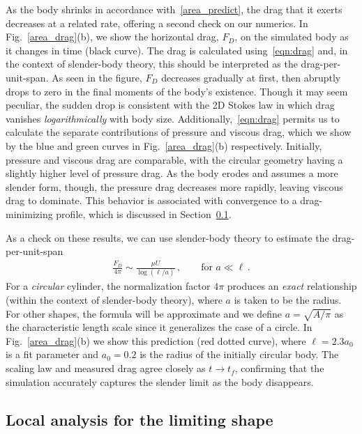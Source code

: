 \documentclass[preprint, 10pt]{elsarticle}
\begin{document}
As the body shrinks in accordance with~\eqref{area_predict}, the drag that it exerts decreases at a related rate, offering a second check on our numerics. In Fig.~\ref{area_drag}(b), we show the horizontal drag, $F_D$, on the simulated body as it changes in time (black curve). The drag is calculated using~\eqref{eqn:drag} and, in the context of slender-body theory, this should be interpreted as the drag-per-unit-span. As seen in the figure, $F_D$ decreases gradually at first, then abruptly drops to zero in the final moments of the body's existence. Though it may seem peculiar, the sudden drop is consistent with the 2D Stokes law in which drag vanishes {\em logarithmically} with body size. Additionally,~\eqref{eqn:drag} permits us to calculate the separate contributions of pressure and viscous drag, which we show by the blue and green curves in Fig.~\ref{area_drag}(b) respectively. Initially, pressure and viscous drag are comparable, with the circular geometry having a slightly higher level of pressure drag. As the body erodes and assumes a more slender form, though, the pressure drag decreases more rapidly, leaving viscous drag to dominate. This behavior is associated with convergence to a drag-minimizing profile, which is discussed in Section~\ref{LimitingShape}.

As a check on these results, we can use slender-body theory to estimate the drag-per-unit-span
\begin{align}
\label{dragscaling}
\frac{F_D}{4 \pi} \sim \frac{ \mu U}{\log(\ell/a)}\, ,	\qquad \text{for } a \ll \ell \, .
\end{align}
For a {\em circular} cylinder, the normalization factor $4 \pi$ produces an {\em exact} relationship (within the context of slender-body theory), where $a$ is taken to be the radius. For other shapes, the formula will be approximate and we define $a = \sqrt{A/\pi}$ as the characteristic length scale since it generalizes the case of a circle. In Fig.~\ref{area_drag}(b) we show this prediction (red dotted curve), where $\ell = 2.3 a_0$ is a fit parameter and $a_0 = 0.2$ is the radius of the initially circular body. The scaling law and measured drag agree closely as $t \to t_f$, confirming that the simulation accurately captures the slender limit as the body disappears.


\subsection{Local analysis for the limiting shape}
\label{LimitingShape}
 
\end{document}
